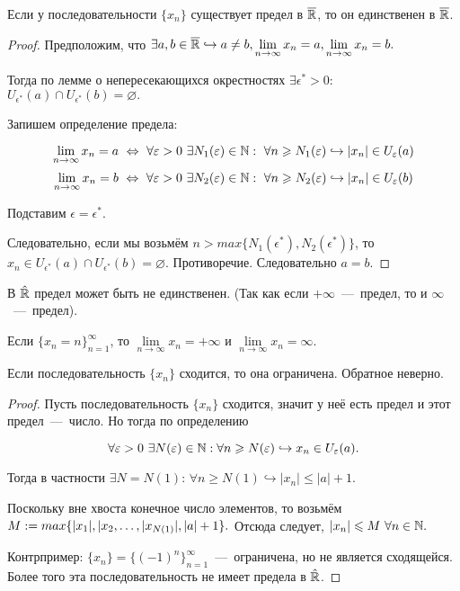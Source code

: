 \begin{theorem}
    Если у последовательности $\{ x_{n} \}$ существует предел в $\overline{\mathbb{R}}$, то он единственен в $\overline{\mathbb{R}}$.
\end{theorem}
\begin{proof}
    Предположим, что $\exists a, b \in \overline{\mathbb{R}} \hookrightarrow a \neq b, \lim\limits_{n\to \infty} x_{n} = a, \lim\limits_{n\to \infty} x_{n} = b.$

    Тогда по лемме о непересекающихся окрестностях $\exists \epsilon^{*} > 0$: $U_{\epsilon^{*}} (a) \cap U_{\epsilon^{*}} (b) = \varnothing.$

    Запишем определение предела:

    $$\lim\limits_{n\to \infty} x_{n} = a \  \Leftrightarrow \   \forall \varepsilon > 0 \  \exists N_{1} (\varepsilon) \in \mathbb{N}: \  \forall n \geqslant N_{1} (\varepsilon) \hookrightarrow |x_{n}| \in U_{\varepsilon}(a)$$
    $$\lim\limits_{n\to \infty} x_{n} = b \  \Leftrightarrow \   \forall \varepsilon > 0 \  \exists N_{2} (\varepsilon) \in \mathbb{N}: \  \forall n \geqslant N_{2} (\varepsilon) \hookrightarrow |x_{n}| \in U_{\varepsilon}(b)$$

    Подставим $\epsilon = \epsilon^{*}.$
    
    Следовательно, если мы возьмём $n > max \{ N_{1} (\epsilon^{*}), N_{2} (\epsilon^{*} )\}$, то $x_{n} \in U_{\epsilon^{*}} (a) \cap U_{\epsilon^{*}} (b) = \varnothing.$ Противоречие. Следовательно $a = b$.
\end{proof}
\begin{note}
    В $\Hat{\mathbb{R}}$ предел может быть не единственен. (Так как если $+\infty$~---~предел, то и $\infty$~---~предел).

    Если $\{ x_{n} = n \}^{\infty}_{n = 1}$, то $ \lim\limits_{n\to \infty} x_{n} = +\infty$ и $ \lim\limits_{n\to \infty} x_{n} = \infty$.
\end{note}
\begin{theorem}
    Если последовательность $\{ x_{n} \}$ сходится, то она ограничена. Обратное неверно.
\end{theorem}
\begin{proof}
    Пусть последовательность $\{ x_{n} \}$ сходится, значит у неё есть предел и этот предел~---~число. Но тогда по определению

    $$ \forall \varepsilon > 0 \  \exists N(\varepsilon) \in \mathbb{N}: \forall n \geqslant N(\varepsilon) \hookrightarrow x_{n} \in U_{\varepsilon} (a).$$

    Тогда в частности $\exists N = N(1)$: $\forall n \geq N(1) \hookrightarrow |x_{n}| \leq |a| + 1.$

    Поскольку вне хвоста конечное число элементов, то возьмём $M := max \{ |x_{1}|, |x_{2}, \ldots, |x_{N(1)}|, \newline |a| + 1\}.$ Отсюда следует, $|x_{n}| \leqslant M \  \forall n \in \mathbb{N}.$

    Контрпример: $\{ x_{n} \} = \{ (-1)^{n} \}^{\infty}_{n = 1}$~---~ограничена, но не является сходящейся. Более того эта последовательность не имеет предела в $\Hat{\mathbb{R}}$.
\end{proof}

